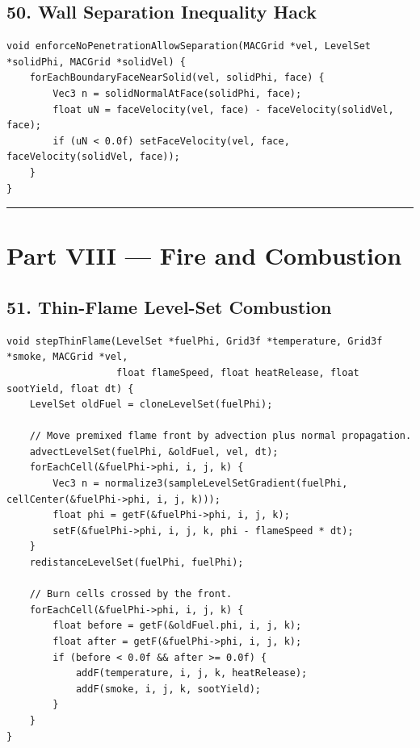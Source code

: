 \documentclass[10pt,letterpaper]{article}
\begin{document}
\subsection*{50. Wall Separation Inequality Hack}

\begin{verbatim}
void enforceNoPenetrationAllowSeparation(MACGrid *vel, LevelSet *solidPhi, MACGrid *solidVel) {
    forEachBoundaryFaceNearSolid(vel, solidPhi, face) {
        Vec3 n = solidNormalAtFace(solidPhi, face);
        float uN = faceVelocity(vel, face) - faceVelocity(solidVel, face);
        if (uN < 0.0f) setFaceVelocity(vel, face, faceVelocity(solidVel, face));
    }
}
\end{verbatim}

\medskip\hrule\medskip

\clearpage
{}
\section*{Part VIII --- Fire and Combustion}

\subsection*{51. Thin-Flame Level-Set Combustion}

\begin{verbatim}
void stepThinFlame(LevelSet *fuelPhi, Grid3f *temperature, Grid3f *smoke, MACGrid *vel,
                   float flameSpeed, float heatRelease, float sootYield, float dt) {
    LevelSet oldFuel = cloneLevelSet(fuelPhi);

    // Move premixed flame front by advection plus normal propagation.
    advectLevelSet(fuelPhi, &oldFuel, vel, dt);
    forEachCell(&fuelPhi->phi, i, j, k) {
        Vec3 n = normalize3(sampleLevelSetGradient(fuelPhi, cellCenter(&fuelPhi->phi, i, j, k)));
        float phi = getF(&fuelPhi->phi, i, j, k);
        setF(&fuelPhi->phi, i, j, k, phi - flameSpeed * dt);
    }
    redistanceLevelSet(fuelPhi, fuelPhi);

    // Burn cells crossed by the front.
    forEachCell(&fuelPhi->phi, i, j, k) {
        float before = getF(&oldFuel.phi, i, j, k);
        float after = getF(&fuelPhi->phi, i, j, k);
        if (before < 0.0f && after >= 0.0f) {
            addF(temperature, i, j, k, heatRelease);
            addF(smoke, i, j, k, sootYield);
        }
    }
}
\end{verbatim}
\end{document}

